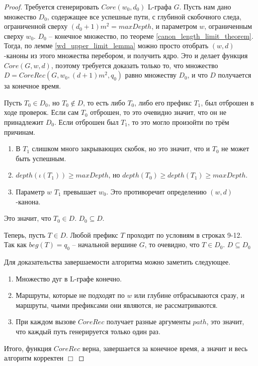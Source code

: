 \begin{proof}
    Требуется сгенерировать $Core(w_0, d_0)$ L-графа $G$. 
    Пусть нам дано множество $D_0$, содержащее все успешные пути, 
    с глубиной скобочного следа, ограниченной сверху $(d_0+1)m^2 = maxDepth$, 
    и параметром $w$, ограниченным сверху $w_0$. 
    $D_0$ -- конечное множество, по теореме \ref{canon_length_limit_theorem}.
    Тогда, по лемме \ref{wd_upper_limit_lemma} можно просто отобрать $(w,d)$-каноны из этого множества перебором, 
    и получить ядро. 
    Это и делает функция $Core(G, w, d)$, поэтому требуется доказать только то, 
    что множество $D = CoreRec(G, w_0, (d+1)m^2, q_0)$ равно множеству $D_0$, и что $D$ получается за конечное время.

    Пусть $T_0 \in D_0$, но $T_0 \notin D$, то есть либо $T_0$, либо его префикс $T_1$, был отброшен в ходе проверок.
    Если сам $T_0$ отброшен, то это очевидно значит, что он не принадлежит $D_0$.
    Если отброшен был $T_1$, то это могло произойти по трём причинам.
    \begin{enumerate}
        \item В $T_1$ слишком много закрывающих скобок, но это значит, что и $T_0$ не может быть успешным.
        \item $depth(\iota(T_1)) \ge maxDepth$, но $depth(T_0) \geq depth(T_1) \ge maxDepth$.
        \item Параметр $w$ $T_1$ превышает $w_0$. Это противоречит определению $(w,d)$-канона.
    \end{enumerate}
    Это значит, что $T_0 \in D$. $D_0 \subseteq D$.

    Теперь, пусть $T \in D$. Любой префикс $T$ проходит по условиям в строках 9-12. Так как $beg(T) = q_0$ -- начальной вершине $G$,
    то очевидно, что $T \in D_0$. $D \subseteq D_0$

    Для доказательства завершаемости алгоритма можно заметить следующее.
    \begin{enumerate}
        \item Множество дуг в L-графе конечно.
        \item Маршруты, которые не подходят по $w$ или глубине отбрасываются сразу, и маршруты, чьими префиксами они являются, не рассматриваются.
        \item При каждом вызове $CoreRec$ получает разные аргументы $path$, это значит, что каждый путь генерируется только один раз.
    \end{enumerate}

    Итого, функция $CoreRec$ верна, завершается за конечное время, а значит и весь алгоритм корректен $\Box$ 
\end{proof}

